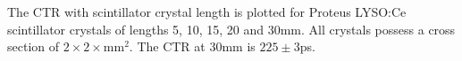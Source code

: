 \label{fig:standardctr} The CTR with scintillator crystal length is plotted for Proteus LYSO:Ce scintillator crystals of lengths 5, 10, 15, 20 and 30mm. All crystals possess a cross section of $2\times2\times$mm$^2$. The CTR at 30mm is $225\pm3$ps.